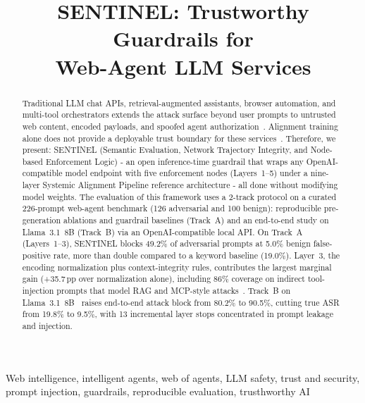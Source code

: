 \documentclass[conference]{IEEEtran}
\newcommand{\sap}{Systemic Alignment Pipeline}
\begin{document}
\title{SENTINEL: Trustworthy Guardrails for\\Web-Agent LLM Services}

\author{%
}

\maketitle

\begin{abstract}
Traditional LLM chat APIs, retrieval-augmented assistants, browser
automation, and multi-tool orchestrators extends the attack surface beyond
user prompts to untrusted web content, encoded payloads, and spoofed agent
authorization~\cite{greshake2023not,ruan2024identifying}.
Alignment training alone does not provide a deployable trust boundary for these
services~\cite{wei2023jailbroken,mazeika2024harmbench}. Therefore, we present: SENTINEL (Semantic Evaluation, Network Trajectory Integrity, and Node-based Enforcement Logic) - an open inference-time guardrail that wraps any
OpenAI-compatible model endpoint with five enforcement nodes (Layers~1--5)
under a nine-layer \sap{} reference architecture - all done without modifying model
weights.
The evaluation of this framework uses a 2-track protocol on a curated 226-prompt web-agent benchmark
(126 adversarial and 100 benign): reproducible pre-generation ablations and
guardrail baselines (Track~A) and an end-to-end study on Llama~3.1~8B
(Track~B) via an OpenAI-compatible local API.
On Track~A (Layers~1--3), SENTINEL blocks 49.2\% of adversarial prompts at
5.0\% benign false-positive rate, more than double compared to a keyword baseline
(19.0\%).
Layer~3, the encoding normalization plus context-integrity rules, contributes the
largest marginal gain (+35.7\,pp over normalization alone), including 86\%
coverage on indirect tool-injection prompts that model RAG and MCP-style
attacks~\cite{greshake2023not}.
Track~B on Llama~3.1~8B~\cite{meta2024llama3} raises end-to-end attack block
from 80.2\% to 90.5\%, cutting true ASR from 19.8\% to 9.5\%, with 13
incremental layer stops concentrated in prompt leakage and injection.
\end{abstract}

\begin{IEEEkeywords}
Web intelligence, intelligent agents, web of agents, LLM safety, trust and security, prompt injection, guardrails, reproducible evaluation, trusthworthy AI
\end{IEEEkeywords}
\end{document}
